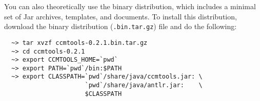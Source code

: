 You can also theoretically use the binary distribution, which includes a minimal
set of Jar archives, templates, and documents. To install this distribution,
download the binary distribution ({\tt *.bin.tar.gz}) file and do the following:
\begin{small}
\begin{verbatim}
  ~> tar xvzf ccmtools-0.2.1.bin.tar.gz
  ~> cd ccmtools-0.2.1
  ~> export CCMTOOLS_HOME=`pwd`
  ~> export PATH=`pwd`/bin:$PATH
  ~> export CLASSPATH=`pwd`/share/java/ccmtools.jar: \
                      `pwd`/share/java/antlr.jar:    \
                      $CLASSPATH
\end{verbatim}
\end{small}

